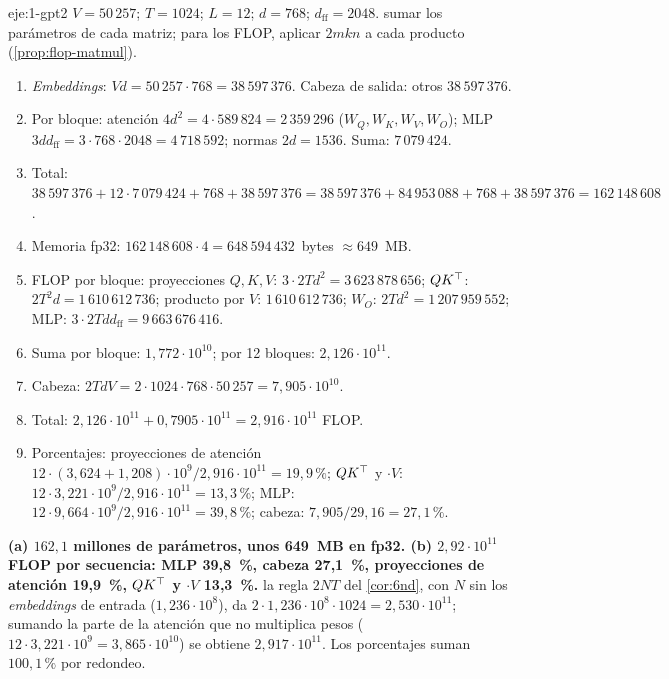 \begin{solucion}{eje:1-gpt2}
\datos $V=50\,257$; $T=1024$; $L=12$; $d=768$; $d_{\mathrm{ff}}=2048$.
\planteamiento sumar los parámetros de cada matriz; para los FLOP, aplicar $2mkn$ a cada producto (\cref{prop:flop-matmul}).
\pasos
\begin{enumerate}[label=\arabic*.]
  \item \emph{Embeddings}: $Vd=50\,257\cdot 768=38\,597\,376$. Cabeza de salida: otros $38\,597\,376$.
  \item Por bloque: atención $4d^{2}=4\cdot 589\,824=2\,359\,296$ ($W_Q,W_K,W_V,W_O$); MLP $3dd_{\mathrm{ff}}=3\cdot 768\cdot 2048=4\,718\,592$; normas $2d=1536$. Suma: $7\,079\,424$.
  \item Total: $38\,597\,376+12\cdot 7\,079\,424+768+38\,597\,376=38\,597\,376+84\,953\,088+768+38\,597\,376=162\,148\,608$.
  \item Memoria fp32: $162\,148\,608\cdot 4=648\,594\,432$~bytes $\approx 649$~MB.
  \item FLOP por bloque: proyecciones $Q,K,V$: $3\cdot 2Td^{2}=3\,623\,878\,656$; $QK^{\top}$: $2T^{2}d=1\,610\,612\,736$; producto por $V$: $1\,610\,612\,736$; $W_O$: $2Td^{2}=1\,207\,959\,552$; MLP: $3\cdot 2Tdd_{\mathrm{ff}}=9\,663\,676\,416$.
  \item Suma por bloque: $1{,}772\cdot 10^{10}$; por 12 bloques: $2{,}126\cdot 10^{11}$.
  \item Cabeza: $2TdV=2\cdot 1024\cdot 768\cdot 50\,257=7{,}905\cdot 10^{10}$.
  \item Total: $2{,}126\cdot 10^{11}+0{,}7905\cdot 10^{11}=2{,}916\cdot 10^{11}$ FLOP.
  \item Porcentajes: proyecciones de atención $12\cdot(3{,}624+1{,}208)\cdot 10^{9}/2{,}916\cdot 10^{11}=19{,}9\,\%$; $QK^{\top}$ y $\cdot V$: $12\cdot 3{,}221\cdot 10^{9}/2{,}916\cdot 10^{11}=13{,}3\,\%$; MLP: $12\cdot 9{,}664\cdot 10^{9}/2{,}916\cdot 10^{11}=39{,}8\,\%$; cabeza: $7{,}905/29{,}16=27{,}1\,\%$.
\end{enumerate}
\resultado \textbf{(a) $162{,}1$ millones de parámetros, unos 649~MB en fp32. (b) $2{,}92\cdot 10^{11}$ FLOP por secuencia: MLP 39{,}8~\%, cabeza 27{,}1~\%, proyecciones de atención 19{,}9~\%, $QK^{\top}$ y $\cdot V$ 13{,}3~\%.}
\comprobacion la regla $2NT$ del \cref{cor:6nd}, con $N$ sin los \emph{embeddings} de entrada ($1{,}236\cdot 10^{8}$), da $2\cdot 1{,}236\cdot 10^{8}\cdot 1024=2{,}530\cdot 10^{11}$; sumando la parte de la atención que no multiplica pesos ($12\cdot 3{,}221\cdot 10^{9}=3{,}865\cdot 10^{10}$) se obtiene $2{,}917\cdot 10^{11}$. Los porcentajes suman $100{,}1\,\%$ por redondeo.
\end{solucion}

